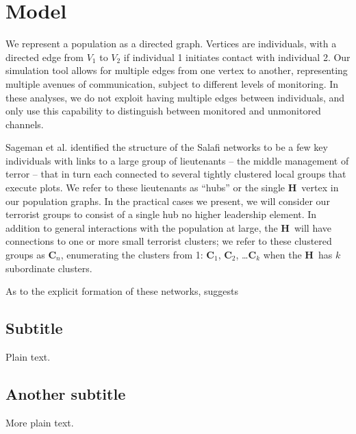 \documentclass{article}
\newcommand{\Hub}[0]{\ensuremath{\mathbf{H}}}
\newcommand{\C}[1]{\ensuremath{\mathbf{C}_{#1}}}
\begin{document}
\section*{Model}
We represent a population as a directed graph.  Vertices are individuals, with a directed edge from $V_1$ to $V_2$ if individual 1 initiates contact with individual 2.  Our simulation tool allows for multiple edges from one vertex to another, representing multiple avenues of communication, subject to different levels of monitoring.  In these analyses, we do not exploit having multiple edges between individuals, and only use this capability to distinguish between monitored and unmonitored channels.  

Sageman et al. identified the structure of the Salafi networks to be a few key individuals with links to a large group of lieutenants -- the middle management of terror -- that in turn each connected to several tightly clustered local groups that execute plots.  We refer to these lieutenants as ``hubs'' or the single \Hub\ vertex in our population graphs.  In the practical cases we present, we will consider our terrorist groups to consist of a single hub no higher leadership element.  In addition to general interactions with the population at large, the \Hub\ will have connections to one or more small terrorist clusters; we refer to these clustered groups as \C{n}, enumerating the clusters from 1: \C{1}, \C{2}, \ldots \C{k} when the \Hub\ has $k$ subordinate clusters.

As to the explicit formation of these networks, \cite{sageman} suggests

\subsection{Subtitle}

Plain text.

\subsection{Another subtitle}

More plain text.

\newpage

\end{document}

